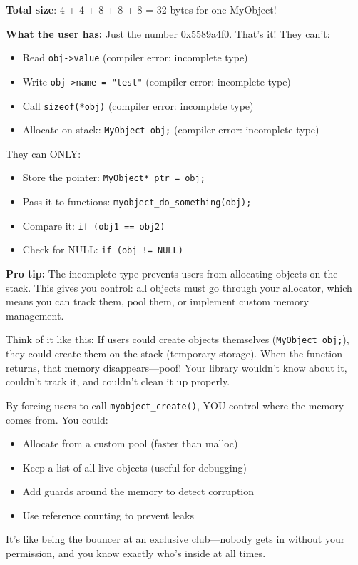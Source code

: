 \textbf{Total size}: 4 + 4 + 8 + 8 + 8 = 32 bytes for one MyObject!

\textbf{What the user has:} Just the number 0x5589a4f0. That's it! They can't:
\begin{itemize}
    \item Read \texttt{obj->value} (compiler error: incomplete type)
    \item Write \texttt{obj->name = "test"} (compiler error: incomplete type)
    \item Call \texttt{sizeof(*obj)} (compiler error: incomplete type)
    \item Allocate on stack: \texttt{MyObject obj;} (compiler error: incomplete type)
\end{itemize}

They can ONLY:
\begin{itemize}
    \item Store the pointer: \texttt{MyObject* ptr = obj;}
    \item Pass it to functions: \texttt{myobject\_do\_something(obj);}
    \item Compare it: \texttt{if (obj1 == obj2)}
    \item Check for NULL: \texttt{if (obj != NULL)}
\end{itemize}

\begin{tipbox}
\textbf{Pro tip:} The incomplete type prevents users from allocating objects on the stack. This gives you control: all objects must go through your allocator, which means you can track them, pool them, or implement custom memory management.

Think of it like this: If users could create objects themselves (\texttt{MyObject obj;}), they could create them on the stack (temporary storage). When the function returns, that memory disappears---poof! Your library wouldn't know about it, couldn't track it, and couldn't clean it up properly.

By forcing users to call \texttt{myobject\_create()}, YOU control where the memory comes from. You could:
\begin{itemize}
    \item Allocate from a custom pool (faster than malloc)
    \item Keep a list of all live objects (useful for debugging)
    \item Add guards around the memory to detect corruption
    \item Use reference counting to prevent leaks
\end{itemize}

It's like being the bouncer at an exclusive club---nobody gets in without your permission, and you know exactly who's inside at all times.
\end{tipbox}

